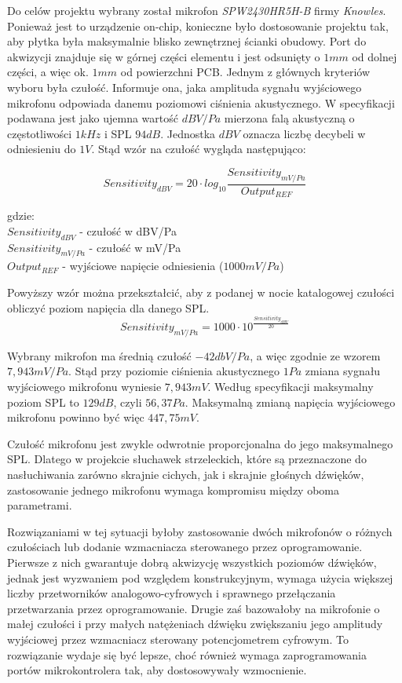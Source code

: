 Do celów projektu wybrany został mikrofon \textit{SPW2430HR5H-B} firmy \textit{Knowles}. Ponieważ jest to urządzenie on-chip, konieczne było dostosowanie projektu tak, aby płytka była maksymalnie blisko zewnętrznej ścianki obudowy. Port do akwizycji znajduje się w górnej części elementu i jest odsunięty o $ 1mm $ od dolnej części, a więc ok. $ 1mm $ od powierzchni PCB.
Jednym z głównych kryteriów wyboru była czułość. Informuje ona, jaka amplituda sygnału wyjściowego mikrofonu odpowiada danemu poziomowi ciśnienia akustycznego. W specyfikacji podawana jest jako ujemna wartość $dBV/Pa$ mierzona falą akustyczną o częstotliwości $1kHz$ i SPL $94dB$. Jednostka $dBV$ oznacza liczbę decybeli w odniesieniu do $1V$\cite{MicSens}. Stąd wzór na czułość wygląda następująco:

\begin{equation}
Sensitivity_{dBV} = 20 \cdot log_{10}\frac{Sensitivity_{mV/Pa}}{Output_{REF}}
\end{equation}

gdzie: \\
\indent$Sensitivity_{dBV}$ - czułość w dBV/Pa \\
\indent$Sensitivity_{mV/Pa}$ - czułość w mV/Pa \\
\indent$Output_{REF}$ - wyjściowe napięcie odniesienia ($1000mV/Pa$) 

Powyższy wzór można przekształcić, aby z podanej w nocie katalogowej czułości obliczyć poziom napięcia dla danego SPL.
\begin{equation}
Sensitivity_{mV/Pa} = 1000 \cdot 10^{\frac{Sensitivity_{dBV}}{20}}
\end{equation}

Wybrany mikrofon ma średnią czułość $-42 dbV/Pa$, a więc zgodnie ze wzorem $7,943 mV/Pa$. Stąd przy poziomie ciśnienia akustycznego $1Pa$ zmiana sygnału wyjściowego mikrofonu wyniesie $7,943 mV$. Według specyfikacji maksymalny poziom SPL to $129 dB$, czyli $56,37 Pa$. Maksymalną zmianą napięcia wyjściowego mikrofonu powinno być więc $447,75 mV$.

Czułość mikrofonu jest zwykle odwrotnie proporcjonalna do jego maksymalnego SPL. Dlatego w projekcie słuchawek strzeleckich, które są przeznaczone do nasłuchiwania zarówno skrajnie cichych, jak i skrajnie głośnych dźwięków, zastosowanie jednego mikrofonu wymaga kompromisu między oboma parametrami. 

Rozwiązaniami w tej sytuacji byłoby zastosowanie dwóch mikrofonów o różnych czułościach lub dodanie wzmacniacza sterowanego przez oprogramowanie. Pierwsze z nich gwarantuje dobrą akwizycję wszystkich poziomów dźwięków, jednak jest wyzwaniem pod względem konstrukcyjnym, wymaga użycia większej liczby przetworników analogowo-cyfrowych i sprawnego przełączania przetwarzania przez oprogramowanie. Drugie zaś bazowałoby na mikrofonie o małej czułości i przy małych natężeniach dźwięku zwiększaniu jego amplitudy wyjściowej przez wzmacniacz sterowany potencjometrem cyfrowym. To rozwiązanie wydaje się być lepsze, choć również wymaga zaprogramowania portów mikrokontrolera tak, aby dostosowywały wzmocnienie.

